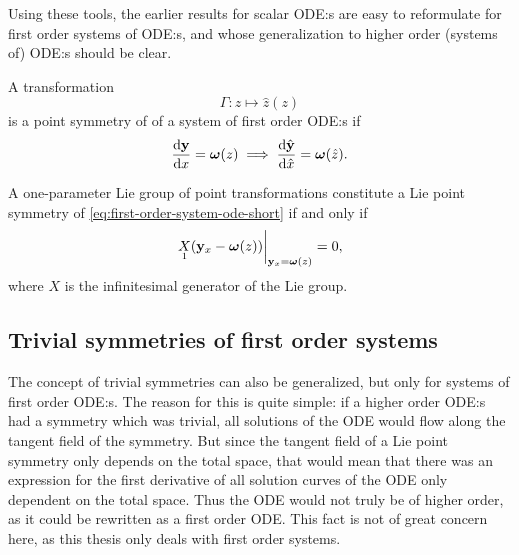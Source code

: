 Using these tools, the earlier results for scalar ODE:s are easy to reformulate for first order systems of ODE:s, and whose generalization to higher order (systems of) ODE:s should be clear.
\begin{defn} \label{defn:general-symmetry}
  A transformation 
  \begin{equation}
    \Gamma: z \mapsto \hat{z}(z)
  \end{equation}
  is a point symmetry of of a system of first order ODE:s  if
  \begin{equation}
    \diff{\vb{y}}{x} = \vb*{\omega}(z)
    \implies
    \diff{\hat{\vb{y}}}{\hat{x}} = \vb*{\omega}(\hat{z}).
  \end{equation}
\end{defn}
\begin{thm} \label{thm:linearized-general-symmetry}
  A one-parameter Lie group of point transformations constitute a Lie point symmetry of \cref{eq:first-order-system-ode-short} if and only if
  \begin{equation} \label{eq:linearized-general-symmetry}
    \eval{\prolong{X}{1}(\vb{y}_x - \vb*{\omega}(z))}_{\vb{y}_x = \vb*{\omega}(z)} = 0,
  \end{equation}
  where \(X\) is the infinitesimal generator of the Lie group.
\end{thm}

\subsection{Trivial symmetries of first order systems}

The concept of trivial symmetries can also be generalized, but only for systems of first order ODE:s.
The reason for this is quite simple: if a higher order ODE:s had a symmetry which was trivial, all solutions of the ODE would flow along the tangent field of the symmetry.
But since the tangent field of a Lie point symmetry only depends on the total space, that would mean that there was an expression for the first derivative of all solution curves of the ODE only dependent on the total space.
Thus the ODE would not truly be of higher order, as it could be rewritten as a first order ODE.
This fact is not of great concern here, as this thesis only deals with first order systems.

